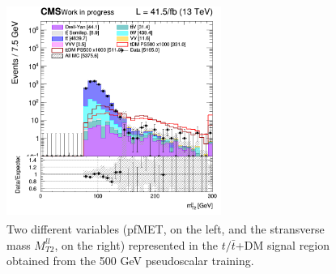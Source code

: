 \documentclass[a4paper, 10pt, openright]{report}
\begin{document}
\begin{figure}[htbp]
{\begin{minipage}[b]{.48\textwidth}
\end{minipage}\hfill
\begin{minipage}[b]{.48\textwidth}
\includegraphics[width=7cm, height=7cm]{figs/2017/SmearSR-ttDM-pseudo500/log_cratio_ST_topCR_ll_BDT_ttDM500_mt2ll.png}
\end{minipage} \hfill
}
\caption{Two different variables (pf\ac{MET}, on the left, and the stransverse mass $M_{T2}^{ll}$, on the right) represented in the $t /\bar t$+DM signal region obtained from the 500 GeV pseudoscalar training.}
\label{fig:SR7}
\end{figure}
\end{document}
